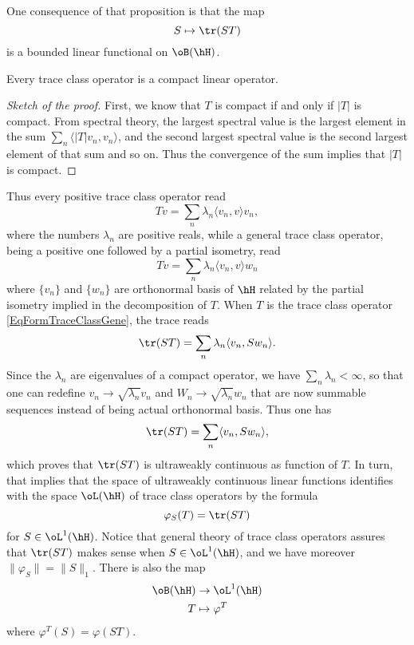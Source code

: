 One consequence of that proposition is that the map
\begin{equation}
	S\mapsto \tr(ST)
\end{equation}
is a bounded linear functional on $\oB(\hH)$.

\begin{proposition}
Every trace class operator is a compact linear operator.
\end{proposition}

\begin{proof}[Sketch of the proof]
First, we know that $T$ is compact if and only if $| T |$ is compact. From spectral theory, the largest spectral value is the largest element in the sum $\sum_n\langle | T |v_n, v_n\rangle $, and the second largest spectral value is the second largest element of that sum and so on. Thus the convergence of the sum implies that $| T |$ is compact.
\end{proof}

Thus every positive trace class operator read
\begin{equation}
	Tv=\sum_n\lambda_n\langle v_n, v\rangle v_n,
\end{equation}
where the numbers $\lambda_n$ are positive reals, while a general trace class operator, being a positive one followed by a partial isometry, read
\begin{equation}		\label{EqFormTraceClassGene}
	Tv=\sum_n\lambda_n\langle v_n, v\rangle w_n
\end{equation}
where $\{ v_n \}$ and $\{ w_n \}$ are orthonormal basis of $\hH$ related by the partial isometry implied in the decomposition of $T$. When $T$ is the trace class operator \eqref{EqFormTraceClassGene}, the trace reads
\begin{equation}
	\tr(ST)=\sum_n\lambda_n\langle v_n, Sw_n\rangle .
\end{equation}
Since the $\lambda_n$ are eigenvalues of a compact operator, we have $\sum_n\lambda_n<\infty$, so that one can redefine $v_n\to \sqrt{\lambda_n}v_n$ and $W_n\to \sqrt{\lambda_n}w_n$ that are now summable sequences instead of being actual orthonormal basis. Thus one has
\begin{equation}
	\tr(ST)=\sum_n\langle v_n, Sw_n\rangle ,
\end{equation}
which proves that $\tr(ST)$ is ultraweakly continuous as function of $T$. In turn, that implies that the space of ultraweakly continuous linear functions identifies with the space $\oL(\hH)$ of trace class operators by the formula
\begin{equation}
	\varphi_S(T)=\tr(ST)
\end{equation}
for $S\in\oL^1(\hH)$. Notice that general theory of trace class operators assures that $\tr(ST)$ makes sense when $S\in\oL^1(\hH)$, and we have moreover $\| \varphi_S \|=\| S \|_1$. There is also the map
\begin{equation}
\begin{aligned}
 \oB(\hH)&\to \oL^1(\hH) \\ 
   T&\mapsto \varphi^T 
\end{aligned}
\end{equation}
where $\varphi^T(S)=\varphi(ST)$.

